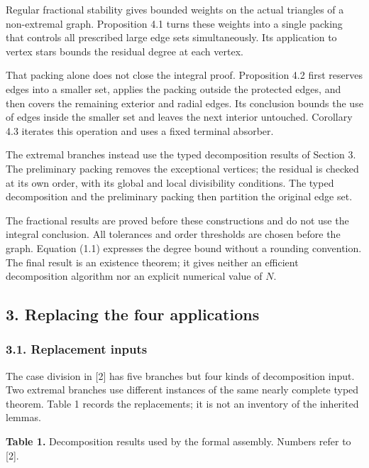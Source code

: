 \documentclass[english,11pt,a4paper]{article}
\begin{document}
Regular fractional stability gives bounded weights on the actual triangles of a non-extremal graph. Proposition 4.1 turns these weights into a single packing that controls all prescribed large edge sets simultaneously. Its application to vertex stars bounds the residual degree at each vertex.

That packing alone does not close the integral proof. Proposition 4.2 first reserves edges into a smaller set, applies the packing outside the protected edges, and then covers the remaining exterior and radial edges. Its conclusion bounds the use of edges inside the smaller set and leaves the next interior untouched. Corollary 4.3 iterates this operation and uses a fixed terminal absorber.

The extremal branches instead use the typed decomposition results of Section 3. The preliminary packing removes the exceptional vertices; the residual is checked at its own order, with its global and local divisibility conditions. The typed decomposition and the preliminary packing then partition the original edge set.

The fractional results are proved before these constructions and do not use the integral conclusion. All tolerances and order thresholds are chosen before the graph. Equation (1.1) expresses the degree bound without a rounding convention. The final result is an existence theorem; it gives neither an efficient decomposition algorithm nor an explicit numerical value of \(N\).


\subsection{3. Replacing the four applications}\label{replacing-the-four-applications}

\subsubsection{3.1. Replacement inputs}\label{replacement-inputs}

The case division in {[}2{]} has five branches but four kinds of decomposition input. Two extremal branches use different instances of the same nearly complete typed theorem. Table 1 records the replacements; it is not an inventory of the inherited lemmas.


\textbf{Table 1.} Decomposition results used by the formal assembly. Numbers refer to {[}2{]}.
\end{document}
